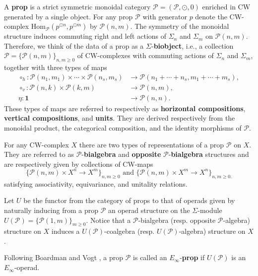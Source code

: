 \documentclass{amsart}
\renewcommand{\P}{\mathcal{P}}
\newcommand{\CW}{{\mathrm{CW}}}
\newcommand{\Hom}{\mathrm{Hom}}
\renewcommand{\1}{\mathbf{1}}
\theoremstyle{definition}
\begin{document}
A \textbf{prop} is a strict symmetric monoidal category $\P = (\P, \odot, 0)$ enriched in $\CW$ generated by a single object. For any prop $\P$ with generator $p$ denote the CW-complex $\Hom_\P(p^{\odot n}, p^{\odot m})$ by $\P(n,m)$. The symmetry of the monoidal structure induces commuting right and left actions of $\Sigma_n$ and $\Sigma_m$ on $\P(n,m)$. Therefore, we think of the data of a prop as a $\Sigma$-\textbf{biobject}, i.e., a collection $\P = \big\{\P(n,m)\big\}_{n,m\geq0}$ of CW-complexes with commuting actions of $\Sigma_n$ and $\Sigma_m$, together with three types of maps
\begin{align*}
\circ_h : \P(n_1,m_1) \times \cdots \times \P(n_s,m_s) &\to \P(n_1+\cdots+n_s, m_1+\cdots+m_s), \\
\circ_v : \P(n,k) \times \P(k,m) &\to \P(n,m), \\
\eta : \1 &\to \P(n,n).
\end{align*}
These types of maps are referred to respectively as \textbf{horizontal compositions}, \textbf{vertical compositions}, and \textbf{units}. They are derived respectively from the monoidal product, the categorical composition, and the identity morphisms of $\P$. 

For any $\CW$-complex $X$ there are two types of representations of a prop $\P$ on $X$. They are referred to as $\P$-\textbf{bialgebra} and \textbf{opposite} $\P$-\textbf{bialgebra} structures and are respectively given by collections of CW-maps 
\begin{equation*}
\big\{ \P(n,m) \times X^n \to X^m \big\}_{n,m \geq 0} \text{\ \ and \ } \big\{ \P(n,m) \times X^m \to X^n \big\}_{n,m \geq 0.}
\end{equation*}
satisfying associativity, equivariance, and unitality relations.

Let $U$ be the functor from the category of props to that of operads given by naturally inducing from a prop $\P$ an operad structure on the $\Sigma$-module $U(\P)=\{\P(1,m)\}_{m\geq0}$. Notice that a $\P$-bialgebra (resp. opposite $\P$-algebra) structure on $X$ induces a $U(\P)$-coalgebra (resp. $U(\P)$-algebra) structure on $X$.

Following Boardman and Vogt \cite{boardman2006homotopy}, a prop $\P$ is called an $E_\infty$-\textbf{prop} if $U(\P)$ is an $E_\infty$-operad.
\end{document}
